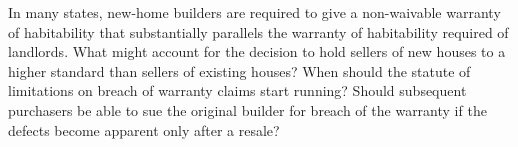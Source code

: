 \item In many states, new-home builders are required to give a non-waivable
warranty of habitability that substantially parallels the warranty of
habitability required of landlords. What might account for the decision to hold
sellers of new houses to a higher standard than sellers of existing houses?
When should the statute of limitations on breach of warranty claims start
running? Should subsequent purchasers be able to sue the original builder for
breach of the warranty if the defects become apparent only after a resale?

